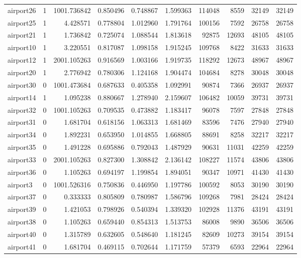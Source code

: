 \begin{longtable}{|l|r|r|r|r|r|r|r|r|r|}
airport26 & 1 & 1001.736842 & 0.850496 & 0.748867 & 1.599363 & 114048 & 8559 & 32149 & 32149 \\
airport25 & 1 & 4.428571 & 0.778804 & 1.012960 & 1.791764 & 100156 & 7592 & 26758 & 26758 \\
airport21 & 1 & 1.736842 & 0.725074 & 1.088544 & 1.813618 & 92875 & 12693 & 48105 & 48105 \\
airport10 & 1 & 3.220551 & 0.817087 & 1.098158 & 1.915245 & 109768 & 8422 & 31633 & 31633 \\
airport12 & 1 & 2001.105263 & 0.916569 & 1.003166 & 1.919735 & 118292 & 12673 & 48967 & 48967 \\
airport20 & 1 & 2.776942 & 0.780306 & 1.124168 & 1.904474 & 104684 & 8278 & 30048 & 30048 \\
airport30 & 0 & 1001.473684 & 0.687633 & 0.405358 & 1.092991 & 90874 & 7366 & 26937 & 26937 \\
airport14 & 1 & 1.095238 & 0.880667 & 1.278940 & 2.159607 & 106482 & 10059 & 39731 & 39731 \\
airport32 & 0 & 1001.105263 & 0.709535 & 0.473882 & 1.183417 & 96078 & 7597 & 27848 & 27848 \\
airport31 & 0 & 1.681704 & 0.618156 & 1.063313 & 1.681469 & 83596 & 7476 & 27940 & 27940 \\
airport34 & 0 & 1.892231 & 0.653950 & 1.014855 & 1.668805 & 88691 & 8258 & 32217 & 32217 \\
airport35 & 0 & 1.491228 & 0.695886 & 0.792043 & 1.487929 & 90631 & 11031 & 42259 & 42259 \\
airport33 & 0 & 2001.105263 & 0.827300 & 1.308842 & 2.136142 & 108227 & 11574 & 43806 & 43806 \\
airport36 & 0 & 1.105263 & 0.694197 & 1.199854 & 1.894051 & 90347 & 10971 & 41430 & 41430 \\
airport3 & 0 & 1001.526316 & 0.750836 & 0.446950 & 1.197786 & 100592 & 8053 & 30190 & 30190 \\
airport37 & 0 & 0.333333 & 0.805809 & 0.780987 & 1.586796 & 109268 & 7981 & 28424 & 28424 \\
airport39 & 0 & 1.421053 & 0.798926 & 0.540394 & 1.339320 & 102928 & 11376 & 43191 & 43191 \\
airport38 & 0 & 1.105263 & 0.659440 & 0.854313 & 1.513753 & 86008 & 9890 & 36506 & 36506 \\
airport40 & 0 & 1.315789 & 0.632605 & 0.548640 & 1.181245 & 82609 & 10273 & 39154 & 39154 \\
airport41 & 0 & 1.681704 & 0.469115 & 0.702644 & 1.171759 & 57379 & 6593 & 22964 & 22964 \\

\end{longtable}
